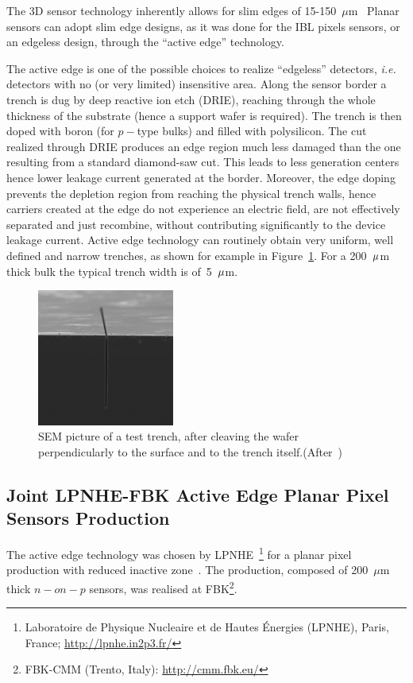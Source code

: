 The 3D sensor technology inherently allows for slim edges of 15-150~$\mu$m~\cite{1748-0221-10-03-C03031} 
Planar sensors can adopt slim edge designs, as it was done for the IBL pixels sensors, or 
an edgeless design, through the ``active edge'' technology.


The active edge is one of the possible choices to realize ``edgeless'' detectors, {\it i.e.} detectors with no (or very limited) insensitive area. Along the sensor border a trench is dug by deep reactive ion etch (DRIE), reaching through the whole thickness of the substrate (hence a support wafer is required).  The  trench is then doped with boron (for $p-$type bulks) and  filled with polysilicon. The cut realized through DRIE produces an edge region
much less damaged than the one resulting from a standard diamond-saw cut. This leads to less generation centers hence lower leakage current generated at the border. Moreover, the edge doping prevents the depletion region from reaching the physical trench walls, hence carriers created at the edge  do not experience an electric field, are not effectively separated and just recombine, without contributing significantly to the device leakage current.
Active edge technology can routinely obtain very uniform, well defined and narrow trenches, as shown for example in Figure~\ref{fig:trench}. For a 200~${\rm \mu}$m thick bulk the typical trench width is of~5~${\rm \mu}$m.

\begin{figure}[!htpb]
\begin{center}
\includegraphics[width=0.40\textwidth]{trench.pdf}
\caption{\label{fig:trench}SEM picture of  a test trench, after cleaving the wafer perpendicularly to the surface and to the trench itself.(After~\cite{bib:nim2012})}
\end{center}
\end{figure}


\subsection{Joint LPNHE-FBK  Active Edge Planar Pixel Sensors Production}
The active edge technology was chosen  by LPNHE~\footnote{Laboratoire de Physique Nucleaire et de Hautes \'Energies (LPNHE), Paris, France; \url{http://lpnhe.in2p3.fr/}} for a  planar pixel production
 with reduced inactive zone~\cite{bib:nim2012}.
The production, composed of 200~$\mu$m thick $n-on-p$ sensors, was realised at FBK\footnote{FBK-CMM (Trento, Italy): \url{http://cmm.fbk.eu/}}.

